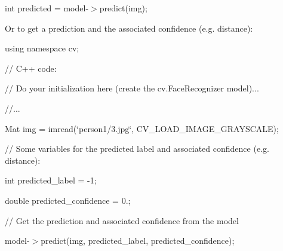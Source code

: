 {\ttfamily int predicted = model-\/$>$predict(img);}

{\ttfamily }

{\ttfamily }

{\ttfamily Or to get a prediction and the associated confidence (e.\+g. distance)\+: }

using namespace cv; {\ttfamily }

{\ttfamily }

{\ttfamily }

{\ttfamily // C++ code\+:}

{\ttfamily }

{\ttfamily }

{\ttfamily // Do your initialization here (create the cv.\+Face\+Recognizer model)...}

{\ttfamily }

{\ttfamily }

{\ttfamily //...}

{\ttfamily }

{\ttfamily }

{\ttfamily Mat img = imread(\char`\"{}person1/3.\+jpg\char`\"{}, C\+V\+\_\+\+L\+O\+A\+D\+\_\+\+I\+M\+A\+G\+E\+\_\+\+G\+R\+A\+Y\+S\+C\+A\+LE);}

{\ttfamily }

{\ttfamily }

{\ttfamily // Some variables for the predicted label and associated confidence (e.\+g. distance)\+:}

{\ttfamily }

{\ttfamily }

{\ttfamily int predicted\+\_\+label = -\/1;}

{\ttfamily }

{\ttfamily }

{\ttfamily double predicted\+\_\+confidence = 0.;}

{\ttfamily }

{\ttfamily }

{\ttfamily // Get the prediction and associated confidence from the model}

{\ttfamily }

{\ttfamily }

{\ttfamily model-\/$>$predict(img, predicted\+\_\+label, predicted\+\_\+confidence);}

{\ttfamily }

